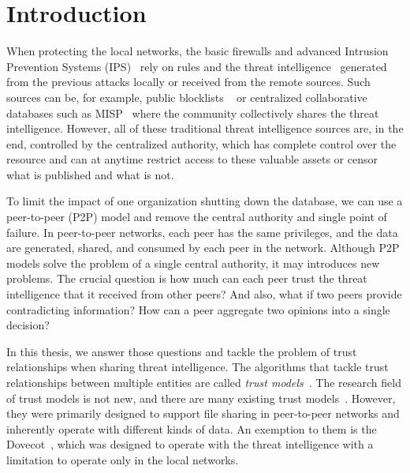 \chapter{Introduction}
\label{ch:introduction}



When protecting the local networks, the basic firewalls and advanced Intrusion Prevention Systems (IPS)~\cite{zhang2004intrusion} rely on rules and the threat intelligence~\cite{threatintelligence} generated from the previous attacks locally or received from the remote sources.
Such sources can be, for example, public blocklists ~\cite{abuseipdb, dataplane, binarydefense} or centralized collaborative databases such as MISP~\cite{wagner2016misp} where the community collectively shares the threat intelligence.
However, all of these traditional threat intelligence sources are, in the end, controlled by the centralized authority, which has complete control over the resource and can at anytime restrict access to these valuable assets or censor what is published and what is not.

To limit the impact of one organization shutting down the database, we can use a peer-to-peer (P2P) model and remove the central authority and single point of failure.
In peer-to-peer networks, each peer has the same privileges, and the data are generated, shared, and consumed by each peer in the network.
Although P2P models solve the problem of a single central authority, it may introduces new problems. The crucial question is how much can each peer trust the threat intelligence that it received from other peers? And also, what if two peers provide contradicting information? How can a peer aggregate two opinions into a single decision?

In this thesis, we answer those questions and tackle the problem of trust relationships when sharing threat intelligence.
The algorithms that tackle trust relationships between multiple entities are called \textit{trust models}~\cite{wang2003trust}.
The research field of trust models is not new, and there are many existing trust models~\cite{abera2019sadan, sort, christensen2014hybrid, 1562680, huynh2006integrated, kamvar2003eigentrust, li2014design, pinyol2013computational, xiong2004peertrust}.
However, they were primarily designed to support file sharing in peer-to-peer networks and inherently operate with different kinds of data.
An exemption to them is the Dovecot~\cite{dita}, which was designed to operate with the threat intelligence with a limitation to operate only in the local networks.

